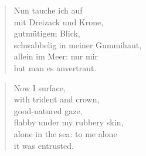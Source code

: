 \clearpage

\begin{verse}

Nun tauche ich auf\\
mit Dreizack und Krone,\\
gutmütigem Blick,\\
schwabbelig in meiner Gummihaut,\\
allein im Meer: nur mir\\
hat man es anvertraut.

\end{verse}

\clearpage

\begin{verse}
Now I surface,\\
with trident and crown,\\
good-natured gaze,\\
flabby under my rubbery skin,\\
alone in the sea: to me alone\\
it was entrusted.

\end{verse}
